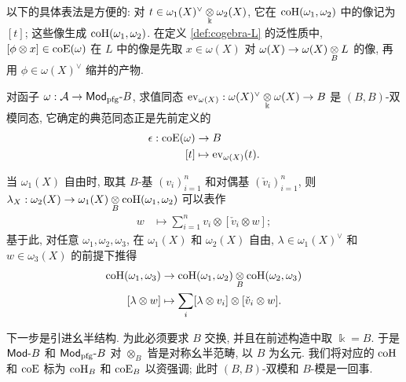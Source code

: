 \begin{convention}\label{con:coend-bracket}
	以下的具体表法是方便的: 对 $t \in \omega_1(X)^\vee \underset{\Bbbk}{\otimes} \omega_2(X)$, 它在 $\operatorname{coH}(\omega_1, \omega_2)$ 中的像记为 $[t]$; 这些像生成 $\operatorname{coH}(\omega_1, \omega_2)$. 在定义 \ref{def:cogebra-L} 的泛性质中, $[\phi \otimes x] \in \operatorname{coE}(\omega)$ 在 $L$ 中的像是先取 $x \in \omega(X)$ 对 $\omega(X) \to \omega(X) \underset{B}{\otimes} L$ 的像, 再用 $\phi \in \omega(X)^\vee$ 缩并的产物.
\end{convention}

对函子 $\omega: \mathcal{A} \to \mathsf{Mod}_{\mathrm{pfg}}\text{-}B$, 求值同态 $\mathrm{ev}_{\omega(X)}: \omega(X)^\vee \underset{\Bbbk}{\otimes} \omega(X) \to B$ 是 $(B, B)$-双模同态, 它确定的典范同态正是先前定义的
\begin{equation}\label{eqn:L-counit}
	\begin{aligned}
		\epsilon: \operatorname{coE}(\omega) & \to B \\
		[t] & \mapsto \mathrm{ev}_{\omega(X)}(t).
	\end{aligned}
\end{equation}

当 $\omega_1(X)$ 自由时, 取其 $B$-基 $(v_i)_{i=1}^n$ 和对偶基 $(\check{v}_i)_{i=1}^n$, 则 $\lambda_X: \omega_2(X) \to \omega_1(X) \underset{B}{\otimes} \operatorname{coH}(\omega_1, \omega_2)$ 可以表作
\begin{equation}\label{eqn:L-coaction}\begin{aligned}
	w & \mapsto \sum_{i=1}^n v_i \otimes [\check{v}_i \otimes w];
\end{aligned}\end{equation}
基于此, 对任意 $\omega_1, \omega_2, \omega_3$, 在 $\omega_1(X)$ 和 $\omega_2(X)$ 自由, $\lambda \in \omega_1(X)^\vee$ 和 $w \in \omega_3(X)$ 的前提下推得
\begin{equation}\label{eqn:L-comult}\begin{aligned}
	\operatorname{coH}(\omega_1, \omega_3) & \to \operatorname{coH}(\omega_1, \omega_2) \underset{B}{\otimes} \operatorname{coH}(\omega_2, \omega_3) \\
	[\lambda \otimes w] & \mapsto \sum_i [\lambda \otimes v_i] \otimes [\check{v}_i \otimes w].
\end{aligned}\end{equation}

下一步是引进幺半结构. 为此必须要求 $B$ 交换, 并且在前述构造中取 $\Bbbk = B$. 于是 $\mathsf{Mod}\text{-}B$ 和 $\mathsf{Mod}_{\mathrm{pfg}}\text{-}B$ 对 $\otimes_B$ 皆是对称幺半范畴, 以 $B$ 为幺元. 我们将对应的 $\operatorname{coH}$ 和 $\operatorname{coE}$ 标为 $\operatorname{coH}_B$ 和 $\operatorname{coE}_B$ 以资强调; 此时 $(B, B)$-双模和 $B$-模是一回事.

